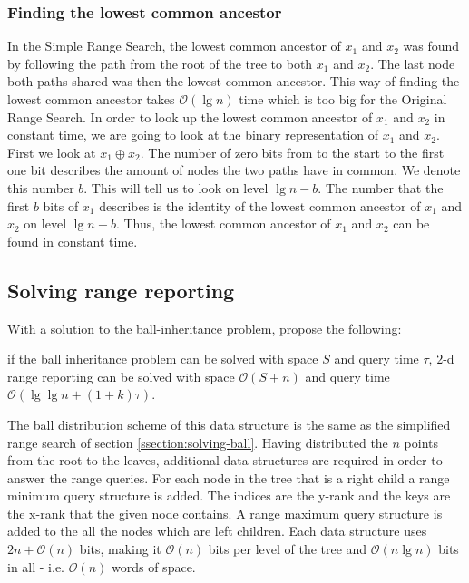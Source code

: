 \subsubsection{Finding the lowest common ancestor}
In the Simple Range Search, the lowest common ancestor of $x_1$ and $x_2$ was found by following the path from the root of the tree to both $x_1$ and $x_2$. The last node both paths shared was then the lowest common ancestor. This way of finding the lowest common ancestor takes $\mathcal{O}(\lg n)$ time which is too big for the Original Range Search.
In order to look up the lowest common ancestor of $x_1$ and $x_2$ in constant time, we are going to look at the binary representation of $x_1$ and $x_2$. First we look at $x_1 \oplus x_2$. The number of zero bits from to the start to the first one bit describes the amount of nodes the two paths have in common. We denote this number $b$. This will tell us to look on level $\lg n - b$. The number that the first $b$ bits of $x_1$ describes is the identity of the lowest common ancestor of $x_1$ and $x_2$ on level $\lg n - b$. Thus, the lowest common ancestor of $x_1$ and $x_2$ can be found in constant time.


\subsection{Solving range reporting}

With a solution to the ball-inheritance problem, \citet{chanetal} propose the following: 
\begin{customlem}{2.4}\label{lemma24}
if the ball inheritance problem can be solved with space $S$ and query time $\tau$, $2$-d range reporting can be solved with space $\mathcal{O}(S+n)$ and query time $\mathcal{O}(\lg \lg n + (1+k) \tau)$.
\end{customlem}


The ball distribution scheme of this data structure is the same as the simplified range search of section \ref{ssection:solving-ball}. Having distributed the $n$ points from the root to the leaves, additional data structures are required in order to answer the range queries. For each node in the tree that is a right child a range minimum query structure is added. The indices are the y-rank and the keys are the x-rank that the given node contains. A range maximum query structure is added to the all the nodes which are left children. Each data structure uses $2n + \mathcal{O}(n)$ bits, making it $\mathcal{O}(n)$ bits per level of the tree and $\mathcal{O}(n \lg n)$ bits in all - i.e. $\mathcal{O}(n)$ words of space. \\

